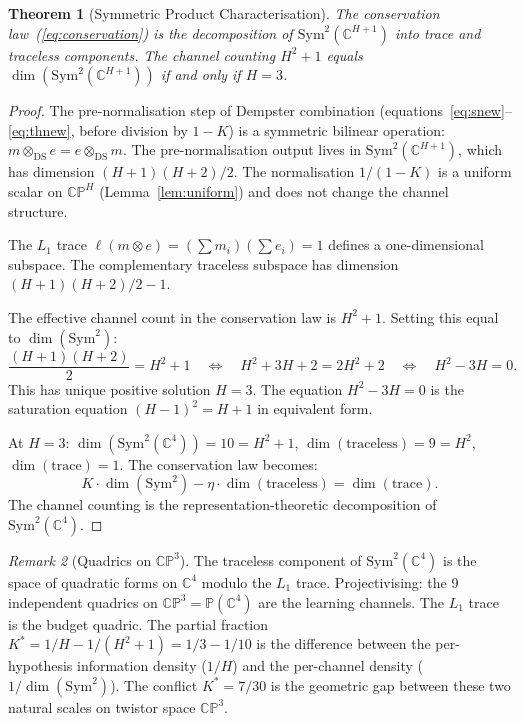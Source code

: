 \documentclass[11pt,a4paper]{article}
\newtheorem{theorem}{Theorem}[section]
\theoremstyle{definition}
\theoremstyle{remark}
\newtheorem{remark}[theorem]{Remark}
\newcommand{\CP}{\mathbb{CP}}
\newcommand{\C}{\mathbb{C}}
\begin{document}
\begin{theorem}[Symmetric Product Characterisation]\label{thm:sym2}
The conservation law~(\ref{eq:conservation}) is the decomposition of $\mathrm{Sym}^2(\C^{H+1})$ into trace and traceless components. The channel counting $H^2+1$ equals $\dim(\mathrm{Sym}^2(\C^{H+1}))$ if and only if $H=3$.
\end{theorem}

\begin{proof}
The pre-normalisation step of Dempster combination (equations~\ref{eq:snew}--\ref{eq:thnew}, before division by $1-K$) is a symmetric bilinear operation: $m\otimes_{\mathrm{DS}}e=e\otimes_{\mathrm{DS}}m$. The pre-normalisation output lives in $\mathrm{Sym}^2(\C^{H+1})$, which has dimension $(H+1)(H+2)/2$. The normalisation $1/(1-K)$ is a uniform scalar on $\CP^{H}$ (Lemma~\ref{lem:uniform}) and does not change the channel structure.

The $L_1$ trace $\ell(m\otimes e)=(\sum m_i)(\sum e_i)=1$ defines a one-dimensional subspace. The complementary traceless subspace has dimension $(H+1)(H+2)/2-1$.

The effective channel count in the conservation law is $H^2+1$. Setting this equal to $\dim(\mathrm{Sym}^2)$:
\[
\frac{(H+1)(H+2)}{2}=H^2+1 \quad\Longleftrightarrow\quad H^2+3H+2=2H^2+2 \quad\Longleftrightarrow\quad H^2-3H=0.
\]
This has unique positive solution $H=3$. The equation $H^2-3H=0$ is the saturation equation $(H-1)^2=H+1$ in equivalent form.

At $H=3$: $\dim(\mathrm{Sym}^2(\C^4))=10=H^2+1$, $\dim(\text{traceless})=9=H^2$, $\dim(\text{trace})=1$. The conservation law becomes:
\begin{equation}\label{eq:sym2}
K\cdot\dim(\mathrm{Sym}^2)-\eta\cdot\dim(\text{traceless})=\dim(\text{trace}).
\end{equation}
The channel counting is the representation-theoretic decomposition of $\mathrm{Sym}^2(\C^4)$.
\end{proof}

\begin{remark}[Quadrics on $\CP^3$]
The traceless component of $\mathrm{Sym}^2(\C^4)$ is the space of quadratic forms on $\C^4$ modulo the $L_1$ trace. Projectivising: the 9 independent quadrics on $\CP^3=\mathbb{P}(\C^4)$ are the learning channels. The $L_1$ trace is the budget quadric. The partial fraction $K^*=1/H-1/(H^2+1)=1/3-1/10$ is the difference between the per-hypothesis information density ($1/H$) and the per-channel density ($1/\dim(\mathrm{Sym}^2)$). The conflict $K^*=7/30$ is the geometric gap between these two natural scales on twistor space $\CP^3$.
\end{remark}
\end{document}
